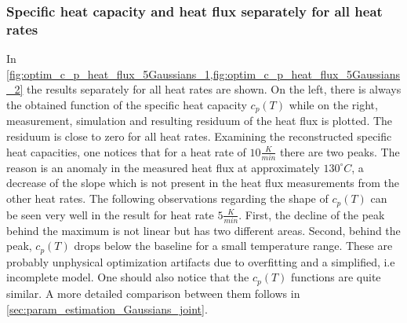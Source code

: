 \documentclass{scrartcl}[12pt, halfparskip]
\numberwithin{equation}{section}
\numberwithin{figure}{section}
\numberwithin{table}{section}
\begin{document}
\subsubsection{Specific heat capacity and heat flux separately for all heat rates}
\label{sec:param_estimation_5Gaussians_c_p_heat_flux_seperately}

In \cref{fig:optim_c_p_heat_flux_5Gaussians_1,fig:optim_c_p_heat_flux_5Gaussians_2} the results separately for all heat rates are shown. On the left, there is always the obtained function of the specific heat capacity $c_p(T)$ while on the right, measurement, simulation and resulting residuum of the heat flux is plotted. 
The residuum is close to zero for all heat rates. Examining the reconstructed specific heat capacities, one notices that for a heat rate of $10 \frac{K}{min}$ there are two peaks. 
The reason is an anomaly in the measured heat flux at approximately $130^{\circ} C$, a decrease of the slope which is not present in the heat flux measurements from the other heat rates. 
The following observations regarding the shape of $c_p(T)$ can be seen very well in the result for heat rate $5 \frac{K}{min}$. 
First, the decline of the peak behind the maximum is not linear but has two different areas. 
Second, behind the peak, $c_p(T)$ drops below the baseline for a small temperature range. 
These are probably unphysical optimization artifacts due to overfitting and a simplified, i.e incomplete model. 
One should also notice that the $c_p(T)$ functions are quite similar.
A more detailed comparison between them follows in \cref{sec:param_estimation_Gaussians_joint}.
\end{document}
